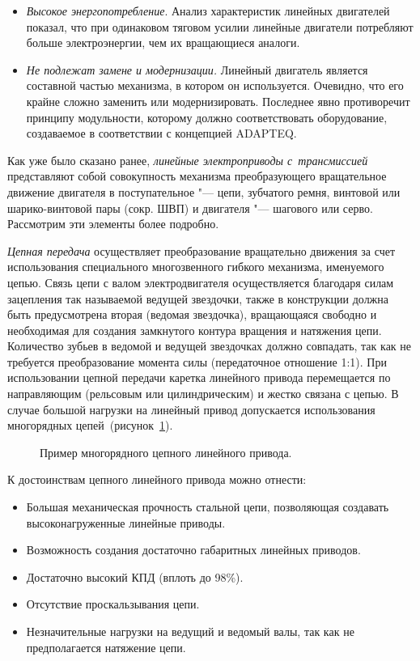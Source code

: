 \begin{itemize}
	\item \textit{Высокое энергопотребление}. Анализ характеристик линейных двигателей показал, что при одинаковом тяговом усилии линейные двигатели потребляют больше электроэнергии, чем их вращающиеся аналоги.
	
	\item \textit{Не подлежат замене и модернизации.} Линейный двигатель является составной частью механизма, в котором он используется. Очевидно, что его крайне сложно заменить или модернизировать. Последнее явно противоречит принципу модульности, которому должно соответствовать оборудование, создаваемое в соответствии с концепцией ADAPTEQ.
\end{itemize}

Как уже было сказано ранее, \textit{линейные электроприводы с~трансмиссией} представляют собой совокупность механизма преобразующего вращательное движение двигателя в поступательное "--- цепи, зубчатого ремня, винтовой или шарико-винтовой пары (сокр. ШВП) и двигателя "--- шагового или серво. Рассмотрим эти элементы более подробно.

\textit{Цепная передача} осуществляет преобразование вращательно движения за счет использования специального многозвенного гибкого механизма, именуемого цепью. Связь цепи с валом электродвигателя осуществляется благодаря силам зацепления так называемой ведущей звездочки, также в конструкции должна быть предусмотрена вторая (ведомая звездочка), вращающаяся свободно и необходимая для создания замкнутого контура вращения и натяжения цепи. Количество зубьев в ведомой и ведущей звездочках должно совпадать, так как не требуется преобразование момента силы (передаточное отношение 1:1). При использовании цепной передачи каретка линейного привода перемещается по направляющим (рельсовым или цилиндрическим) и жестко связана с цепью. В случае большой нагрузки на линейный привод допускается использования многорядных цепей~(рисунок~\cref{fig:chain}).

\begin{figure}[ht]
	\caption{Пример многорядного цепного линейного привода.}\label{fig:chain}
\end{figure}

К достоинствам цепного линейного привода можно отнести:

\begin{itemize}
	\item Большая механическая прочность стальной цепи, позволяющая создавать высоконагруженные линейные приводы.
	
	\item Возможность создания достаточно габаритных линейных приводов.
	
	\item Достаточно высокий КПД (вплоть до 98\%).
	
	\item Отсутствие проскальзывания цепи.
	
	\item Незначительные нагрузки на ведущий и ведомый валы, так как не предполагается натяжение цепи.
\end{itemize}

